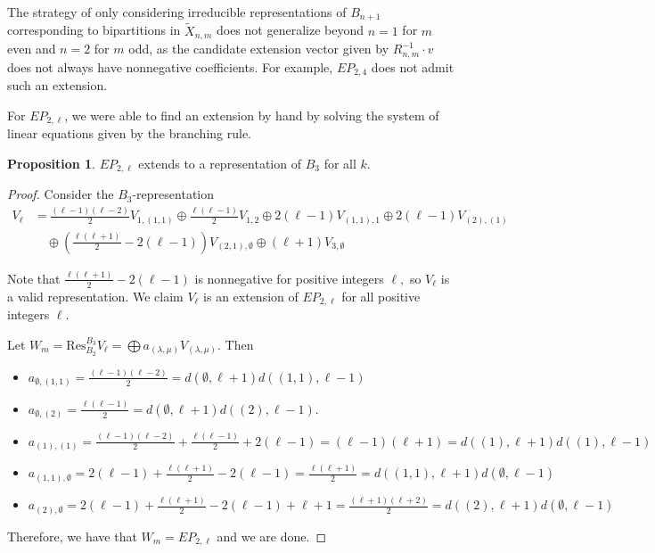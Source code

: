 \documentclass{amsart}
\theoremstyle{plain}
\theoremstyle{definition}
\newtheorem{proposition}[theorem]{Proposition}
\begin{document}
The strategy of only considering irreducible representations of $B_{n+1}$ corresponding to bipartitions in $\tilde X_{n,m}$ does not generalize beyond $n=1$ for $m$ even and $n=2$ for $m$ odd, as the candidate extension vector given by $R_{n,m}^{-1}\cdot v$ does not always have nonnegative coefficients. For example, $EP_{2,4}$ does not admit such an extension. 


For $EP_{2,\ell}$, we were able to find an extension by hand by solving the system of linear equations given by the branching rule. 

\begin{proposition}
    $EP_{2,\ell }$ extends to a representation of $B_3$ for all $k.$
\end{proposition}
\begin{proof}

Consider the $B_3$-representation
\begin{align*}
     V_{\ell}&= \frac{(\ell-1)(\ell-2)}{2} V_{1,(1,1)}\oplus \frac{\ell(\ell-1)}{2}V_{1,2}\oplus 2(\ell-1)V_{(1,1),1}\oplus 2(\ell-1)V_{(2),(1)}\\ &\quad \oplus\left(\frac{\ell(\ell+1)}{2}-2(\ell-1)\right)V_{(2,1),\emptyset}\oplus (\ell+1)V_{3,\emptyset}
\end{align*}

Note that $\frac{\ell(\ell+1)}{2}-2(\ell-1)$ is nonnegative for positive integers $\ell, $ so $V_{\ell}$ is a valid representation. We claim $V_{\ell}$ is an extension of $EP_{2,{\ell}}$ for all positive integers $\ell.$ 

Let $W_m=\mathrm{Res}^{B_3}_{B_2} V_{\ell}=\bigoplus a_{(\lambda,\mu)}V_{(\lambda,\mu)}.$ Then \begin{itemize}
\item $a_{\emptyset,(1,1)}= \frac{(\ell-1)(\ell-2)}{2}= d(\emptyset, \ell+1)d((1,1),\ell-1)$
\item $a_{\emptyset, (2)}=\frac{\ell(\ell-1)}{2}= d(\emptyset,\ell+1)d((2),\ell-1).$ 
\item $a_{(1),(1)}= \frac{(\ell-1)(\ell-2)}{2}+\frac{\ell(\ell-1)}{2}+2(\ell-1)= (\ell-1)(\ell+1)=d((1),\ell+1)d((1),\ell-1)$
\item $a_{(1,1),\emptyset}= 2(\ell-1)+\frac{\ell(\ell+1)}{2}-2(\ell-1)= \frac{\ell(\ell+1)}{2}= d((1,1),\ell+1)d(\emptyset,\ell-1)$
\item$  a_{(2),\emptyset}= 2(\ell-1)+\frac{\ell(\ell+1)}{2}-2(\ell-1)+ \ell+1= \frac{(\ell+1)(\ell+2)}{2}= d((2),\ell+1)d(\emptyset,\ell-1)$
\end{itemize}
Therefore, we have that $W_m= EP_{2,\ell}$ and we are done. 
\end{proof}
\end{document}

